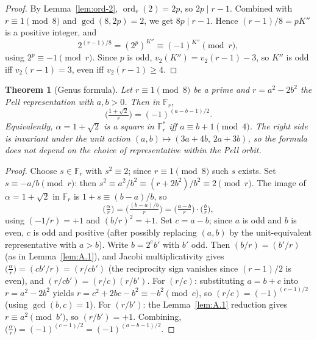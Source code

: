 \documentclass[12pt]{article}
\theoremstyle{plain}
\newtheorem{theorem}{Theorem}[section]
\theoremstyle{definition}
\theoremstyle{remark}
\begin{document}
\begin{proof}
By Lemma~\ref{lem:ord-2}, \(\operatorname{ord}_r(2) = 2p\), so
\(2p \mid r-1\). Combined with \(r \equiv 1 \pmod 8\) and
\(\gcd(8, 2p) = 2\), we get \(8p \mid r-1\). Hence
\((r-1)/8 = pK''\) is a positive integer, and
\[
2^{(r-1)/8} = (2^p)^{K''} \equiv (-1)^{K''} \pmod r,
\]
using \(2^p \equiv -1 \pmod r\). Since \(p\) is odd,
\(v_2(K'') = v_2(r-1) - 3\), so \(K''\) is odd iff \(v_2(r-1) = 3\),
even iff \(v_2(r-1) \geq 4\).\end{proof}


\begin{theorem}[Genus formula]\label{thm:A.7}
Let
\(r \equiv 1 \pmod 8\) be a prime and \(r = a^2 - 2b^2\) the Pell
representation with \(a, b > 0\). Then in \(\mathbb F_r\),
\[
\bigl(\tfrac{1+\sqrt 2}{r}\bigr) = (-1)^{(a-b-1)/2}.
\]
Equivalently, \(\alpha = 1+\sqrt 2\) is a square in
\(\mathbb F_r^*\) iff \(a \equiv b + 1 \pmod 4\). The right side
is invariant under the unit action
\((a,b) \mapsto (3a+4b,\, 2a+3b)\), so the formula does not depend
on the choice of representative within the Pell orbit.
\end{theorem}


\begin{proof}
Choose \(s \in \mathbb F_r\) with \(s^2 \equiv 2\); since
\(r \equiv 1 \pmod 8\) such \(s\) exists. Set \(s \equiv -a/b
\pmod r\): then \(s^2 \equiv a^2/b^2 \equiv (r + 2b^2)/b^2 \equiv 2
\pmod r\). The image of \(\alpha = 1 + \sqrt 2\) in \(\mathbb F_r\)
is \(1 + s \equiv (b - a)/b\), so
\[
\bigl(\tfrac{\alpha}{r}\bigr) = \bigl(\tfrac{(b-a)/b}{r}\bigr)
   = \bigl(\tfrac{a-b}{r}\bigr) \cdot \bigl(\tfrac{b}{r}\bigr),
\]
using \((-1/r) = +1\) and \((b/r)^2 = +1\). Set \(c = a - b\);
since \(a\) is odd and \(b\) is even, \(c\) is odd and positive
(after possibly replacing \((a,b)\) by the unit-equivalent
representative with \(a > b\)). Write \(b = 2^e b'\) with \(b'\)
odd. Then \((b/r) = (b'/r)\) (as in Lemma~\ref{lem:A.1}), and Jacobi
multiplicativity gives
\(\bigl(\tfrac{\alpha}{r}\bigr) = (cb'/r) = (r/cb')\) (the
reciprocity sign vanishes since \((r-1)/2\) is even), and
\((r/cb') = (r/c)(r/b')\). For \((r/c)\): substituting
\(a = b + c\) into \(r = a^2 - 2b^2\) yields
\(r = c^2 + 2bc - b^2 \equiv -b^2 \pmod c\), so
\((r/c) = (-1)^{(c-1)/2}\) (using \(\gcd(b,c) = 1\)).
For \((r/b')\): the Lemma~\ref{lem:A.1} reduction gives \(r \equiv a^2 \pmod{b'}\),
so \((r/b') = +1\). Combining,
\(\bigl(\tfrac{\alpha}{r}\bigr) = (-1)^{(c-1)/2} = (-1)^{(a-b-1)/2}\).\end{proof}
\end{document}
